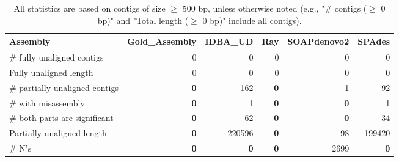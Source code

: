 \documentclass[12pt,a4paper]{article}
\begin{document}
\begin{table}[ht]
\begin{center}
\caption{All statistics are based on contigs of size $\geq$ 500 bp, unless otherwise noted (e.g., "\# contigs ($\geq$ 0 bp)" and "Total length ($\geq$ 0 bp)" include all contigs).}
\begin{tabular}{|l*{5}{|r}|}
\hline
Assembly & Gold\_Assembly & IDBA\_UD & Ray & SOAPdenovo2 & SPAdes \\ \hline
\# fully unaligned contigs & 0 & 0 & 0 & 0 & 0 \\ \hline
Fully unaligned length & 0 & 0 & 0 & 0 & 0 \\ \hline
\# partially unaligned contigs & {\bf 0} & 162 & {\bf 0} & 1 & 92 \\ \hline
\hspace{5mm}\# with misassembly & {\bf 0} & 1 & {\bf 0} & {\bf 0} & 1 \\ \hline
\hspace{5mm}\# both parts are significant & {\bf 0} & 62 & {\bf 0} & {\bf 0} & 34 \\ \hline
Partially unaligned length & {\bf 0} & 220596 & {\bf 0} & 98 & 199420 \\ \hline
\# N's & {\bf 0} & {\bf 0} & {\bf 0} & 2699 & {\bf 0} \\ \hline
\end{tabular}
\end{center}
\end{table}
\end{document}
